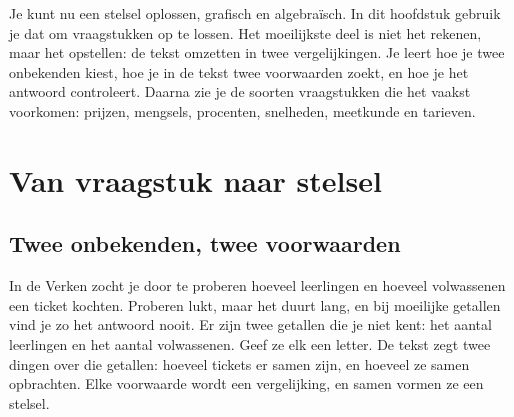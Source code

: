 Je kunt nu een stelsel oplossen, grafisch en algebraïsch. In dit hoofdstuk gebruik je dat om vraagstukken op te lossen. Het moeilijkste deel is niet het rekenen, maar het opstellen: de tekst omzetten in twee vergelijkingen. Je leert hoe je twee onbekenden kiest, hoe je in de tekst twee voorwaarden zoekt, en hoe je het antwoord controleert. Daarna zie je de soorten vraagstukken die het vaakst voorkomen: prijzen, mengsels, procenten, snelheden, meetkunde en tarieven.

\begin{oefeningen}[Start]

\end{oefeningen}

\section{Van vraagstuk naar stelsel}

\subsection{Twee onbekenden, twee voorwaarden}

In de Verken zocht je door te proberen hoeveel leerlingen en hoeveel volwassenen een ticket kochten. Proberen lukt, maar het duurt lang, en bij moeilijke getallen vind je zo het antwoord nooit. Er zijn twee getallen die je niet kent: het aantal leerlingen en het aantal volwassenen. Geef ze elk een letter. De tekst zegt twee dingen over die getallen: hoeveel tickets er samen zijn, en hoeveel ze samen opbrachten. Elke voorwaarde wordt een vergelijking, en samen vormen ze een stelsel.


